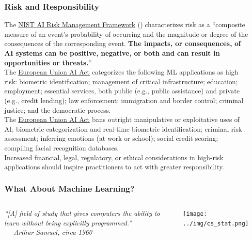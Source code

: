 \documentclass[11pt,aspectratio=169,hyperref={colorlinks}]{beamer}
\begin{document}
		\begin{frame}
	
			\frametitle{Risk and Responsibility}
	
				\small{The \href{https://nvlpubs.nist.gov/nistpubs/ai/NIST.AI.100-1.pdf}{NIST AI Risk Management Framework} (\citet{tabassi2023artificial}) characterizes risk as a ``composite measure of an event’s probability of occurring and the magnitude or degree of the consequences of the corresponding event. \textbf{The impacts, or consequences, of AI systems can be positive, negative, or both and can result in opportunities or threats.}''}\\
				\vspace{10pt}
				\small{The \href{https://artificialintelligenceact.eu/}{European Union AI Act} categorizes the following ML applications as high risk: biometric identification; management of critical infrastructure; education; employment; essential services, both public (e.g., public assistance) and private (e.g., credit lending); law enforcement; immigration and border control; criminal justice; and the democratic process.}\\
				\vspace{10pt}
				\small{The \href{https://artificialintelligenceact.eu/}{European Union AI Act} bans outright manipulative or exploitative uses of AI; biometric categorization and real-time biometric identification; criminal risk assessment; inferring emotions (at work or school); social credit scoring; compiling facial recognition databases.}\\
				\vspace{10pt}
				\small{Increased financial, legal, regulatory, or ethical considerations in high-risk applications should inspire practitioners to act with greater responsibility.}

		\end{frame}	

		\begin{frame}

			\frametitle{What About Machine Learning?}

			\begin{columns}
		
				\column{0.5\linewidth}
					\textit{``[A] field of study that gives computers the ability to learn without being explicitly programmed.''\\ \hspace{20pt} --- \textup{Arthur Samuel}, circa 1960}
	
				\column{0.5\linewidth}
						\centering
						\texttt{[image: ../img/cs\_stat.png]}
						\label{fig:cs_stat}

			\end{columns}
	
		\end{frame}	
\end{document}
